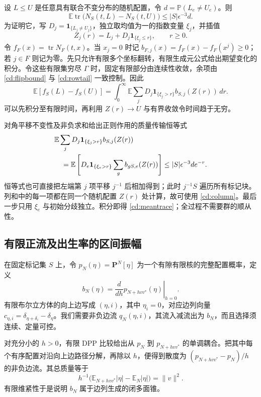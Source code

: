 \documentclass[UTF8,zihao=-4,a4paper]{ctexart}
\numberwithin{equation}{section}
\begin{document}
设 $L\le U$ 是任意具有联合不变分布的随机配置，令
$d=\mathbb P(L_e\ne U_e)$。则
\begin{equation}
\mathbb E\operatorname{tr}\bigl(N_S(t,L)-N_S(t,U)\bigr)
\le |S|\epsilon^{-3}d.
\label{cd:meantrace}
\end{equation}
为证明它，写 $D_j=\mathbf1_{\{L_j\ne U_j\}}$，独立取均值为一的指数变量 $\xi_j$，并插值
\[
Z_j(r)=L_j+D_j\mathbf1_{\{\xi_j\le r\}},\qquad r\ge0.
\]
令 $f_F(x)=\operatorname{tr}N_F(t,x)$。当 $x_j=0$ 时记
$b_{F,j}(x)=f_F(x)-f_F(x^j)\ge0$；若 $j\in F$ 则记为零。先只允许有限多个坐标翻转，有限生成元公式给出期望变化的积分。令这些有限集穷尽 $\Gamma$ 时，固定有限部分由连续性收敛，余项由 \eqref{cd:flipbound} 与 \eqref{cd:rowtail} 一致控制。因此
\begin{equation}
\mathbb E[f_S(L)-f_S(U)]
=\int_0^\infty\mathbb E\sum_j
 D_j\mathbf1_{\{\xi_j>r\}}b_{S,j}(Z(r))\,dr.
\label{cd:generatorinterpolation}
\end{equation}
可以先积分至有限时间，再利用 $Z(r)\to U$ 与有界收敛令时间趋于无穷。

对角平移不变性及非负求和给出正则作用的质量传输恒等式
\begin{align}
&\mathbb E\sum_jD_j\mathbf1_{\{\xi_j>r\}}b_{S,j}(Z(r))\notag\\
&\quad=\mathbb E\left[
 D_e\mathbf1_{\{\xi_e>r\}}\sum_g b_{gS,e}(Z(r))\right]
\le |S|\epsilon^{-3}d e^{-r}.
\label{cd:masstransport}
\end{align}
恒等式也可直接把左端第 $j$ 项平移 $j^{-1}$ 后相加得到；此时 $j^{-1}S$ 遍历所有标记块。列和中的每一项都在同一个随机配置 $Z(r)$ 处计算，故可使用 \eqref{cd:column}。最后一步只用 $\xi_e$ 与初始分歧独立。积分即得 \eqref{cd:meantrace}；全过程不需要群的顺从性。

\subsection{有限正流及出生率的区间振幅}\label{cd:flows}

在固定标记集 $S$ 上，令 $p_N(\eta)=\mathbf P^N[\eta]$ 为一个有隙有限核的完整配置概率，定义
\begin{equation}
b_N(\eta)=\left.\frac{d}{dh}p_{N+hvv^*}(\eta)\right|_{h=0}.
\label{cd:derivative}
\end{equation}
有限布尔立方体的向上边写成 $(\eta,i)$，其中 $\eta_i=0$，对应边列向量
$c_{\eta,i}=\delta_{\eta+\delta_i}-\delta_\eta$。我们需要非负边流 $q_N(\eta,i)$，其流入减流出为 $b_N$，而且选择须连续、定量可控。

对充分小的 $h>0$，有限 DPP 比较给出从 $p_N$ 到 $p_{N+hvv^*}$ 的单调耦合。把其中每个有序配置对沿向上边路径分解，再除以 $h$，便得到散度为
$(p_{N+hvv^*}-p_N)/h$ 的非负边流。其总质量等于
\[
h^{-1}\bigl(\mathbb E_{N+hvv^*}|\eta|-\mathbb E_N|\eta|\bigr)
=\|v\|^2.
\]
有限维紧性于是说明 $b_N$ 属于边列生成的闭多面锥。
\end{document}

